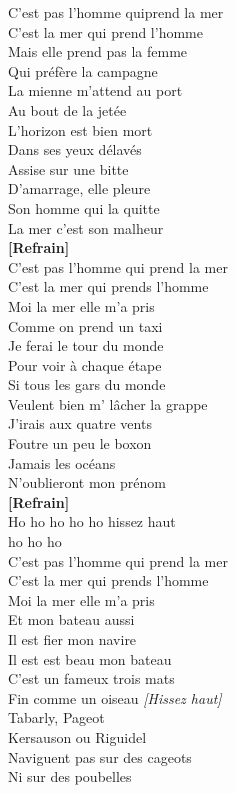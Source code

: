 \documentclass{novel}
\begin{document}
\begin{multicols}{3}
C'est pas l'homme quiprend la mer \\
C'est la mer qui prend l'homme \\
Mais elle prend pas la femme \\
Qui préfère la campagne \\
La mienne m'attend au port \\
Au bout de la jetée \\
L'horizon est bien mort \\
Dans ses yeux délavés \\
Assise sur une bitte \\
D'amarrage, elle pleure \\
Son homme qui la quitte \\
La mer c'est son malheur \\

\textbf{[Refrain]} \\

C'est pas l'homme qui prend la mer \\
C'est la mer qui prends l'homme \\
Moi la mer elle m'a pris \\
Comme on prend un taxi \\
Je ferai le tour du monde \\
Pour voir à chaque étape \\
Si tous les gars du monde \\
Veulent bien m' lâcher la grappe \\
J'irais aux quatre vents \\
Foutre un peu le boxon \\
Jamais les océans \\
N'oublieront mon prénom \\

\textbf{[Refrain]} \\

Ho ho ho ho ho hissez haut \\
ho ho ho \\

C'est pas l'homme qui prend la mer \\
C'est la mer qui prends l'homme \\
Moi la mer elle m'a pris \\
Et mon bateau aussi \\
Il est fier mon navire \\
Il est est beau mon bateau \\
C'est un fameux trois mats \\
Fin comme un oiseau \emph{[Hissez haut]} \\
Tabarly, Pageot \\
Kersauson ou Riguidel \\
Naviguent pas sur des cageots \\
Ni sur des poubelles \\


\end{multicols}
\end{document}
